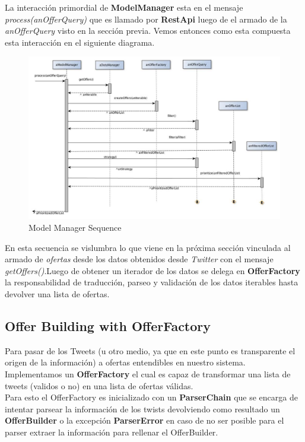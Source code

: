 \documentclass[10pt, a4paper]{article}
\begin{document}
La interacci\'on primordial de \textbf{ModelManager} esta en el mensaje \emph{process(anOfferQuery)} que es llamado por \textbf{RestApi} luego de el armado de la \emph{anOfferQuery} visto en la secci\'on previa. Vemos entonces como esta compuesta esta interacci\'on en el siguiente diagrama. 

\begin{figure}[H]
\centering
\includegraphics[scale=0.50]{graphics/modelManager_sequence.jpg}
\caption{Model Manager Sequence}
\end{figure}

En esta secuencia se vislumbra lo que viene en la pr\'oxima secci\'on vinculada al armado de \emph{ofertas} desde los datos obtenidos desde \emph{Twitter} con el mensaje \emph{getOffers()}.Luego de obtener un iterador de los datos se delega en \textbf{OfferFactory} la responsabilidad de traducci\'on, parseo y validaci\'on de los datos iterables hasta devolver una lista de ofertas.


\subsection{Offer Building with OfferFactory}
Para pasar de los Tweets (u otro medio, ya que en este punto es transparente el origen de la información) a ofertas entendibles en nuestro sistema. Implementamos un \textbf{OfferFactory} el cual es capaz de transformar una lista de tweets (validos o no) en una lista de ofertas válidas.\\

Para esto el OfferFactory es inicializado con un \textbf{ParserChain} que se encarga de intentar parsear la información de los twists devolviendo como resultado un \textbf{OfferBuilder} o la excepción  \textbf{ParserError} en caso de no ser posible para el parser extraer la información para rellenar el OfferBuilder.\\
\end{document}
